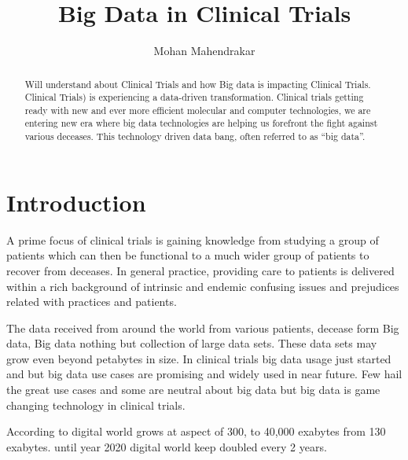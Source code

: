 \documentclass[sigconf]{acmart}
\begin{document}
\title{Big Data in Clinical Trials}
\author{Mohan Mahendrakar}

\renewcommand{\shortauthors}{B. Trovato et al.}


\begin{abstract}
Will understand about Clinical Trials and how Big
data is impacting Clinical Trials. Clinical Trials) is experiencing a
data-driven transformation. Clinical trials getting ready with new and 
ever more efficient molecular and computer technologies, we are entering
new era where big data technologies are helping us forefront the fight 
against various deceases. This technology driven data bang, often 
referred to as ``big data''.
\end{abstract}


\maketitle

\section{Introduction}
A prime focus of clinical trials is gaining knowledge from studying
a group of patients which can then be functional to a much wider group of
patients to recover from deceases. In general practice, providing care 
to patients is delivered within a rich background of intrinsic and
endemic confusing issues and prejudices related with practices and 
patients\cite{TR02}.

The data received from around the world from various patients, 
decease form Big data, Big data nothing but collection of large 
data sets. These data sets may grow even beyond petabytes in size.  
In clinical trials big data usage just started and but big data use
cases are promising and widely used in near future. Few hail the great
use cases and some are neutral about big data but big data is game 
changing technology in clinical trials\cite{TR05}. 

According to \cite{TR07} digital world grows at aspect of 300, to 
40,000 exabytes from 130 exabytes. until year 2020  digital world 
keep doubled every 2 years. 
\end{document}
